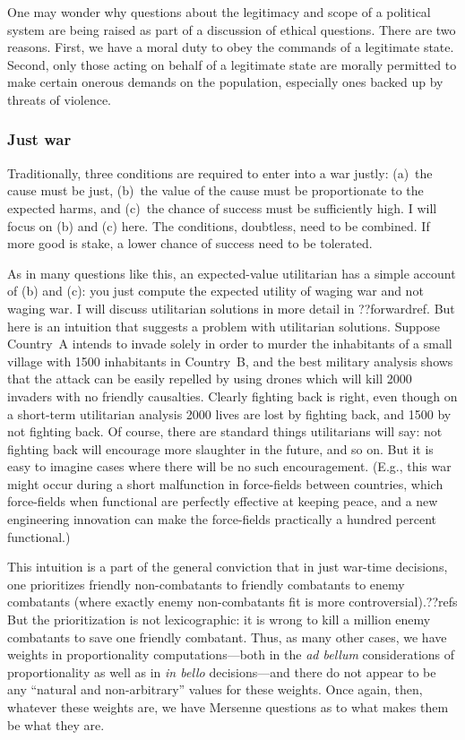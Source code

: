 One may wonder why questions about the legitimacy and scope of a political system are being raised as part of a discussion of ethical
questions. There are two reasons. First, we have a moral duty to obey the commands of a legitimate state. Second, only those
acting on behalf of a legitimate state are morally permitted to make certain onerous demands on the population, especially ones backed up 
by threats of violence.  

\subsubsection{Just war}
Traditionally, three conditions are required to enter into a war justly: (a)~the cause must be just,
(b)~the value of the cause must be proportionate to the expected harms, and (c)~the chance of success must be 
sufficiently high. I will focus on (b) and (c) here. The conditions, doubtless, need to be combined.
If more good is stake, a lower chance of success need to be tolerated. 

As in many questions like this, 
an expected-value utilitarian has a simple account of (b) and (c): you just compute the expected utility 
of waging war and not waging war. I will discuss utilitarian solutions in more detail in ??forwardref. 
But here is an intuition that suggests a problem with utilitarian solutions. Suppose Country~A intends
to invade solely in order to murder the inhabitants of a small village with 1500 inhabitants in Country~B, 
and the best military analysis shows that the attack can be easily repelled by using drones which will 
kill 2000 invaders with no friendly causalties. Clearly fighting back is right, even though on a short-term
utilitarian analysis 2000 lives are lost by fighting back, and 1500 by not fighting back. Of course, there 
are standard things utilitarians will say: not fighting back will encourage more slaughter in the future,
and so on. But it is easy to imagine cases where there will be no such encouragement. (E.g., this war might occur
during a short malfunction in force-fields between countries, which force-fields when functional are perfectly 
effective at keeping peace, and a new engineering innovation can make the force-fields practically a hundred
percent functional.)

This intuition is a part of the general conviction that in just war-time decisions, one prioritizes friendly non-combatants
to friendly combatants to enemy combatants (where exactly enemy non-combatants fit is more controversial).??refs
But the prioritization is not lexicographic: it is wrong to kill a million enemy combatants to save one friendly combatant.
Thus, as many other cases, we have weights in proportionality computations---both in the \textit{ad bellum} considerations of 
proportionality as well as in \textit{in bello} decisions---and there do not appear to be any ``natural and non-arbitrary''
values for these weights. Once again, then, whatever these weights are, we have Mersenne questions as to what makes them 
be what they are.

